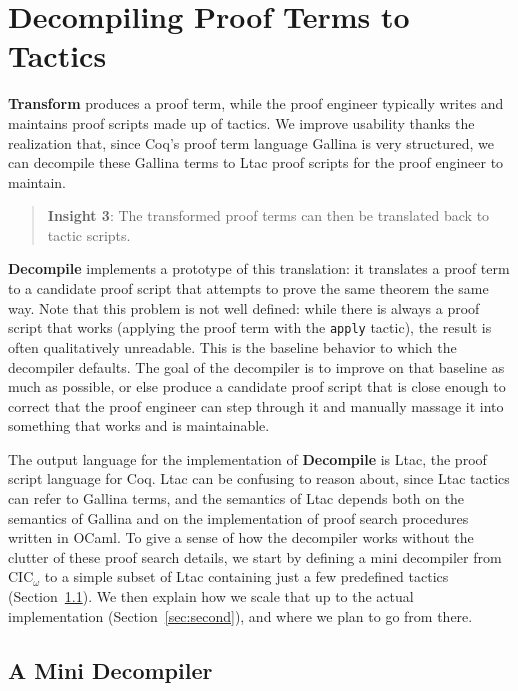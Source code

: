 \section{Decompiling Proof Terms to Tactics}
\label{sec:decompiler}

\textbf{Transform} produces a proof term,
while the proof engineer typically writes and maintains proof scripts made up of tactics.
We improve usability thanks the realization that, since Coq's proof term language Gallina is very structured,
we can decompile these Gallina terms to Ltac proof scripts for the proof engineer to maintain.

\begin{quote}
\textbf{Insight 3}: The transformed proof terms can then be translated back to tactic scripts.
\end{quote}

\textbf{Decompile} implements a prototype of this translation:
it translates a proof term to a candidate proof script that attempts to prove the same theorem the same way.
Note that this problem is not well defined: while there is always a proof script that 
works (applying the proof term with the \lstinline{apply} tactic), the result is often qualitatively unreadable.
This is the baseline behavior to which the decompiler defaults.
The goal of the decompiler is to improve on that baseline as much as possible,
or else produce a candidate proof script that is close enough to correct that the proof engineer can step through it
and manually massage it into something that works and is maintainable.

The output language for the implementation of \textbf{Decompile} is Ltac, the proof script language for Coq.
Ltac can be confusing to reason about, since Ltac tactics can refer to Gallina terms, and the semantics of Ltac depends both on the
semantics of Gallina and on the implementation of proof search procedures written in OCaml.
To give a sense of how the decompiler works without the clutter of these proof search details, we start by defining a mini
decompiler from CIC$_{\omega}$ to a simple subset of Ltac containing just a few predefined tactics (Section~\ref{sec:first}).
We then explain how we scale that up to the actual implementation (Section~\ref{sec:second}), and where we plan to go from there.

\subsection{A Mini Decompiler}
\label{sec:first}

